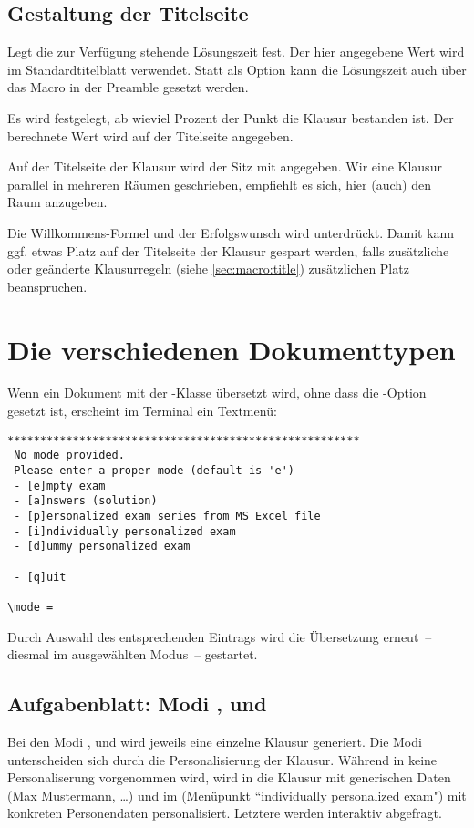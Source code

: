\documentclass[
load=osgexam,
babel=ngerman
]{skdoc}
\begin{document}
\subsection*{Gestaltung der Titelseite}
Legt die zur Verfügung stehende Lösungszeit fest. Der hier angegebene Wert wird im Standardtitelblatt verwendet.
Statt als Option kann die Lösungszeit auch über das Macro  in der Preamble gesetzt werden.
\medskip

Es wird festgelegt, ab wieviel Prozent der Punkt die Klausur bestanden ist. Der berechnete Wert wird auf der Titelseite
angegeben.
\medskip

Auf der Titelseite der Klausur wird der Sitz mit angegeben. Wir eine Klausur parallel in mehreren Räumen
geschrieben, empfiehlt es sich, hier (auch) den Raum anzugeben.
\medskip

Die Willkommens-Formel und der Erfolgswunsch wird unterdrückt. Damit kann ggf. etwas Platz auf der
Titelseite der Klausur gespart werden, falls zusätzliche oder geänderte Klausurregeln (siehe \ref{sec:macro:title})
zusätzlichen Platz beanspruchen. 
\medskip

\section{Die verschiedenen Dokumenttypen}
Wenn ein Dokument mit der \thepkg-Klasse übersetzt wird, ohne dass die -Option gesetzt ist, erscheint
im Terminal ein Textmenü:
\begin{verbatim}
******************************************************
 No mode provided.
 Please enter a proper mode (default is 'e') 
 - [e]mpty exam
 - [a]nswers (solution)
 - [p]ersonalized exam series from MS Excel file
 - [i]ndividually personalized exam
 - [d]ummy personalized exam

 - [q]uit 

\mode =
\end{verbatim}

Durch Auswahl des entsprechenden Eintrags wird die Übersetzung erneut~-- diesmal im ausgewählten Modus~-- gestartet.

\subsection{Aufgabenblatt: Modi ,  und }
Bei den Modi  ,  und  wird jeweils eine einzelne Klausur generiert.
Die Modi unterscheiden sich durch die Personalisierung der Klausur. Während in  keine Personaliserung
vorgenommen wird, wird in  die Klausur mit generischen Daten (Max Mustermann, \ldots) und im 
(Menüpunkt ``individually personalized exam") mit konkreten Personendaten personalisiert. Letztere werden interaktiv
abgefragt.
\end{document}
